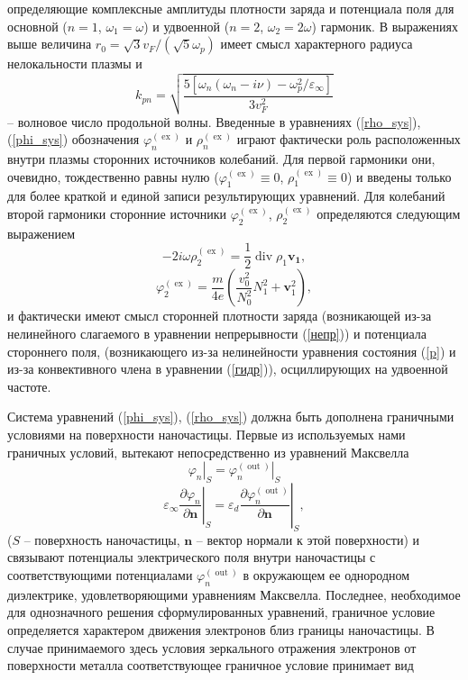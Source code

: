 \documentclass[12pt, a4paper]{article}
\renewcommand{\vec}{\mathbf}
\def \eps {\varepsilon}
\def \w {\omega}
\def \ph {\varphi}
\def \ex { \operatorname{ex}}
\def \out { \operatorname{out}}
\newcommand{\dn}[1]{\left.\frac{\partial #1}{\partial \vec{n}}\right|_{ S}}
\begin{document}
определяющие комплексные амплитуды плотности заряда и потенциала поля для основной ($n=1$, $\w_1=\w$) и удвоенной ($n=2$, $\w_2=2\w$) гармоник.
В выражениях выше величина $r_0 = \sqrt{3}v_F/(\sqrt{5}\w_p)$ имеет смысл характерного радиуса нелокальности плазмы и  
\begin{equation} 
k_{pn} = \sqrt{\frac{5[\w_{n}(\w_{n} - i\nu) - \w_p^2/\eps_\infty]}{3v_F^2}} 
\end{equation}
-- волновое число продольной волны.
Введенные в уравнениях (\ref{rho_sys}), (\ref{phi_sys}) обозначения $\ph^{(\ex)}_{n}$ и $\rho^{(\ex)}_{n}$ играют фактически роль расположенных внутри плазмы сторонних источников колебаний. Для первой гармоники они, очевидно, тождественно равны нулю ($\ph^{(\ex)}_1\equiv0$, $\rho^{(\ex)}_1\equiv0$) и введены только для более краткой и единой записи результирующих уравнений. Для колебаний второй гармоники сторонние источники $\ph^{(\ex)}_2$, $\rho^{(\ex)}_2$ определяются следующим выражением 
\begin{equation}
	\label{rho_ex}
 - 2i\w \rho^{(\ex)}_2 = \frac{1}{2}\operatorname{div} \rho_1 \vec{v_1},
\end{equation}
\begin{equation}
	\label{phi_ex}
\ph^{(\ex)}_2 = \frac{m}{4e}\left(\frac{v_0^2}{N_0^2}N_1^2 + \vec{v}_1^2\right),
\end{equation}
и фактически имеют смысл сторонней плотности заряда (возникающей из-за нелинейного слагаемого в уравнении непрерывности (\ref{непр})) и потенциала стороннего поля, (возникающего из-за нелинейности уравнения состояния (\ref{p}) и из-за конвективного члена в уравнении (\ref{гидр})), осциллирующих на удвоенной частоте. 

Система уравнений (\ref{phi_sys}), (\ref{rho_sys}) должна быть дополнена граничными условиями на поверхности наночастицы. Первые из используемых нами граничных условий, вытекают непосредственно из уравнений Максвелла
\begin{equation} 
	\label{g_u1}
	\left. \ph_n \right|_{ S} = \left. \ph_n^{(\out)} \right|_{ S} 
\end{equation}
\begin{equation} 
	\label{g_u2}
	\eps_\infty \dn{\ph_n} = \eps_d \dn{\ph_n^{(\out)}},
\end{equation}
($S$ -- поверхность наночастицы, $\vec{n}$ -- вектор нормали к этой поверхности) и связывают потенциалы электрического поля внутри наночастицы с соответствующими потенциалами $\ph_{n}^{(\out)}$ в окружающем ее однородном диэлектрике, удовлетворяющими уравнениям Максвелла.
Последнее, необходимое для однозначного решения сформулированных уравнений, граничное условие определяется характером движения электронов близ границы наночастицы. В случае принимаемого здесь условия зеркального отражения электронов от поверхности металла соответствующее граничное условие принимает вид
\end{document}
